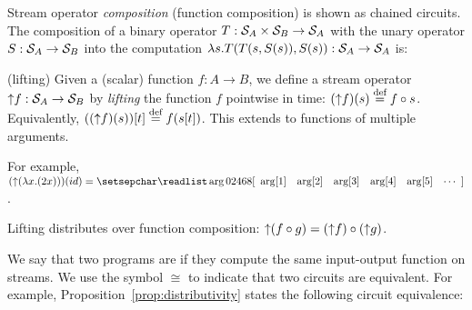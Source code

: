 Stream operator \emph{composition} (function composition) is shown as chained circuits.
The composition of a binary operator $T: \mathcal{S}_{A} \times \mathcal{S}_{B} \to \mathcal{S}_{A}$ with the
unary operator $S: \mathcal{S}_{A} \to \mathcal{S}_{B}$ into the computation
$\lambda s. T(T(s,S(s)),S(s)) : \mathcal{S}_{A}\to\mathcal{S}_{A}$
is:

\begin{center}
\end{center}


\begin{definition}(lifting)
Given a (scalar) function $f: A \to B$,
we define a stream operator ${\uparrow}f :\mathcal{S}_{A} \to \mathcal{S}_{B}$
by \emph{lifting} the function $f$ pointwise in time: $({\uparrow}f)(s) \stackrel{\textrm{\scriptsize def}}{=} f \circ s$.
Equivalently, $(({\uparrow}f)(s))[t] \stackrel{\textrm{\scriptsize def}}{=} f(s[t])$.
This extends to functions of multiple arguments.
\end{definition}

\ifstreamexamples
For example, $(\lift{(\lambda x.(2x))})(id) = \sv{0 2 4 6 8}$.
\fi

\begin{proposition}[distributivity]\label{prop:distributivity}
Lifting distributes over function composition:
${\uparrow}(f \circ g) = ({\uparrow}f) \circ ({\uparrow}g)$.
\end{proposition}
\begin{comment}
\begin{proof}
This is easily proved by using associativity of function composition:
$\forall s . (\lift{(f \circ g)})(s) = (f \circ g) \circ s =
f \circ (g \circ s) = f \circ (\lift{g})(s) = (\lift{f})((\lift{g})(s)) =
(\lift{f} \circ \lift{g})(s).$
\end{proof}
\end{comment}

We say that two \dbsp programs are  if they compute the same
input-output function on streams.
We use the symbol $\cong$ to indicate that two circuits are
equivalent.  For example, Proposition~\ref{prop:distributivity}
states the following circuit equivalence:

